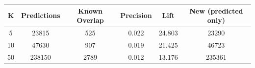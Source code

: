 \begin{tabular}{cccccc}
\toprule
K & Predictions & Known Overlap & Precision & Lift & New (predicted only) \\
\midrule
5 & 23815 & 525 & 0.022 & 24.803 & 23290 \\
10 & 47630 & 907 & 0.019 & 21.425 & 46723 \\
50 & 238150 & 2789 & 0.012 & 13.176 & 235361 \\
\bottomrule
\end{tabular}

